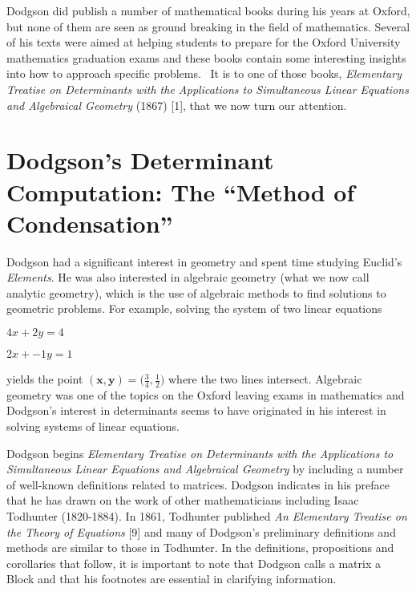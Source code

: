 \documentclass[11pt]{article}%
\theoremstyle{definition}
\begin{document}
Dodgson did publish a number of mathematical books during his years at Oxford,
but none of them are seen as ground breaking in the field of mathematics.
Several of his texts were aimed at helping students to prepare for the Oxford
University mathematics graduation exams and these books contain some
interesting insights into how to approach specific problems. \ It is to one of
those books, \textit{Elementary Treatise on Determinants with the Applications
to Simultaneous Linear Equations} \textit{and Algebraical Geometry} (1867)
[1], that we now turn our attention.

\bigskip

\section{Dodgson's Determinant Computation: The \textquotedblleft Method of
Condensation\textquotedblright}

Dodgson had a significant interest in geometry and spent time studying
Euclid's \textit{Elements}. He was also interested in algebraic geometry (what
we now call analytic geometry), which is the use of algebraic methods to find
solutions to geometric problems. For example, solving the system of two linear equations

\begin{center}
$4x+2y=4$

$2x+-1y=1$
\end{center}

\noindent yields the point $\mathbf{(x,y)}=\mathbf{(}\frac{3}{4},\frac{1}%
{2}\mathbf{)}$ where the two lines intersect. Algebraic geometry was one of
the topics on the Oxford leaving exams in mathematics and Dodgson's interest
in determinants seems to have originated in his interest in solving systems of
linear equations.

Dodgson begins \textit{Elementary Treatise on Determinants with the
Applications to Simultaneous Linear Equations and Algebraical Geometry }by
including a number of well-known definitions related to matrices. Dodgson
indicates in his preface that he has drawn on the work of other mathematicians
including Isaac Todhunter (1820-1884). In 1861, Todhunter published \textit{An
Elementary Treatise on the Theory of Equations} [9] and many of Dodgson's
preliminary definitions and methods are similar to those in Todhunter. In the
definitions, propositions and corollaries that follow, it is important to note
that Dodgson calls a matrix a Block and that his footnotes are essential in
clarifying information.%
\end{document}
